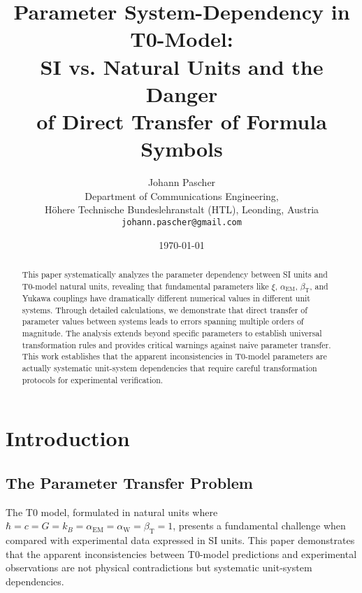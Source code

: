 \documentclass[12pt,a4paper]{article}
\newcommand{\xipar}{\xi}
\begin{document}
	
	\title{Parameter System-Dependency in T0-Model: \\
		SI vs. Natural Units and the Danger \\
		of Direct Transfer of Formula Symbols}
	\author{Johann Pascher\\
		Department of Communications Engineering, \\H{\"o}here Technische Bundeslehranstalt (HTL), Leonding, Austria\\
		\texttt{johann.pascher@gmail.com}}
	\date{\today}
	
	\maketitle
	
	\begin{abstract}
		This paper systematically analyzes the parameter dependency between SI units and T0-model natural units, revealing that fundamental parameters like $\xipar$, $\alpha_{\text{EM}}$, $\beta_{\text{T}}$, and Yukawa couplings have dramatically different numerical values in different unit systems. Through detailed calculations, we demonstrate that direct transfer of parameter values between systems leads to errors spanning multiple orders of magnitude. The analysis extends beyond specific parameters to establish universal transformation rules and provides critical warnings against naive parameter transfer. This work establishes that the apparent inconsistencies in T0-model parameters are actually systematic unit-system dependencies that require careful transformation protocols for experimental verification.
	\end{abstract}
	
	\tableofcontents
	\newpage
	
	\section{Introduction}
	\label{sec:introduction}
	
	\subsection{The Parameter Transfer Problem}
	\label{subsec:parameter_problem}
	
	The T0 model, formulated in natural units where $\hbar = c = G = k_B = \alpha_{\text{EM}} = \alpha_{\text{W}} = \beta_{\text{T}} = 1$, presents a fundamental challenge when compared with experimental data expressed in SI units. This paper demonstrates that the apparent inconsistencies between T0-model predictions and experimental observations are not physical contradictions but systematic unit-system dependencies.
	
\end{document}
